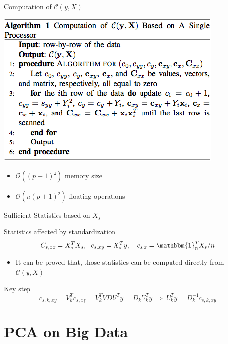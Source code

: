\documentclass[ignorenonframetext,]{beamer}
\providecommand{\tightlist}{%
  \setlength{\itemsep}{0pt}\setlength{\parskip}{0pt}}
\begin{document}
\begin{frame}{Computation of \(\mathcal{C}(y, X)\)}

\includegraphics[width=0.7\linewidth]{./Alg_1}

\begin{itemize}
\tightlist
\item
  \(\mathcal{O}((p+1)^2)\) memory size\\
\item
  \(\mathcal{O}(n(p+1)^2)\) floating operations
\end{itemize}

\end{frame}

\begin{frame}{Sufficient Statistics based on \(X_s\)}

\begin{block}{Statistics affected by standardization}
\[
  C_{s, xx} = X^T_{s}X_{s},~~ c_{s,xy} = X_s^Ty, ~~~c_{s, x} = \mathbbm{1}_{n}^TX_s/n
\]
\end{block}

\begin{itemize}
\tightlist
\item
  It can be proved that, those statistics can be computed directly from
  \(\mathcal{C}(y, X)\)
\end{itemize}

\begin{block}{Key step}
\[
c_{s,k,xy} = V_k^Tc_{s,xy} = V_k^TVDU^Ty= D_kU_k^Ty ~\Rightarrow ~U_k^Ty = D^{-1}_kc_{s,k,xy}    
\]
\end{block}

\end{frame}

\section{PCA on Big Data}\label{pca-on-big-data}
\end{document}

